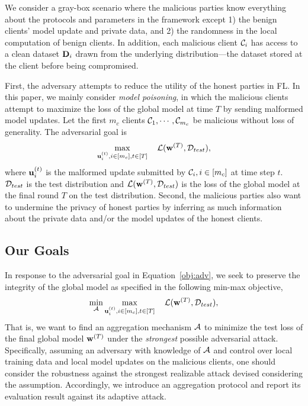 We consider a gray-box scenario where the malicious parties know everything about the protocols and parameters in the framework except 1) the benign clients' model update and private data, and 2) the randomness in the local computation of benign clients. 
In addition, each malicious client $\mathcal{C}_i$ has access to a clean dataset $\mathbf{D}_i$ drawn from the underlying distribution---the dataset stored at the client before being compromised. 


First, the adversary attempts to reduce the utility of the honest parties in FL. In this paper, we mainly consider \emph{model poisoning}, in which the malicious clients attempt to maximize the loss of the global model at time $T$ by sending malformed model updates.
Let the first $m_c$ clients $\mathcal{C}_1, \cdots, \mathcal{C}_{m_c}$ be malicious without loss of generality. The adversarial goal is
\begin{equation}
\label{obj:adv}
    \max_{\mathbf{u}^{(t)}_i, i\in[m_c], t\in[T]}\ \ \  \mathcal{L}(\mathbf{w}^{(T)}, \mathcal{D}_{test}),
\end{equation}
where $\mathbf{u}^{(t)}_i$ is the malformed update submitted by $\mathcal{C}_i, i\in [m_c]$ at time step $t$.
$\mathcal{D}_{test}$ is the test distribution and $\mathcal{L}(\mathbf{w}^{(T)}, \mathcal{D}_{test})$ is the loss of the global model at the final round $T$ on the test distribution. 
Second, the malicious parties also want to undermine the privacy of honest parties by inferring as much information about the private data and/or the model updates of the honest clients.





\subsection{Our Goals}
\label{sec:goals}


In response to the adversarial goal in Equation~\ref{obj:adv}, we seek to preserve the integrity of the global model as specified in the following min-max objective,
\begin{align}
\label{obj:defense}
\min_{\calA}\max_{\bfu^{(t)}_i, i\in[m_c], t\in[T]}\ \ \  \calL(\bfw^{(T)}, \calD_{test}),
\end{align}
That is, we want to find an aggregation mechanism $\mathcal{A}$ to minimize the test loss of the final global model $\mathbf{w}^{(T)}$ under the \textit{strongest} possible adversarial attack.
Specifically, assuming an adversary with knowledge of $\mathcal{A}$ and control over local training data and local model updates on the malicious clients, one should consider the robustness against the strongest realizable attack devised considering the assumption. 
Accordingly, we introduce an aggregation protocol and report its evaluation result against its adaptive attack.


